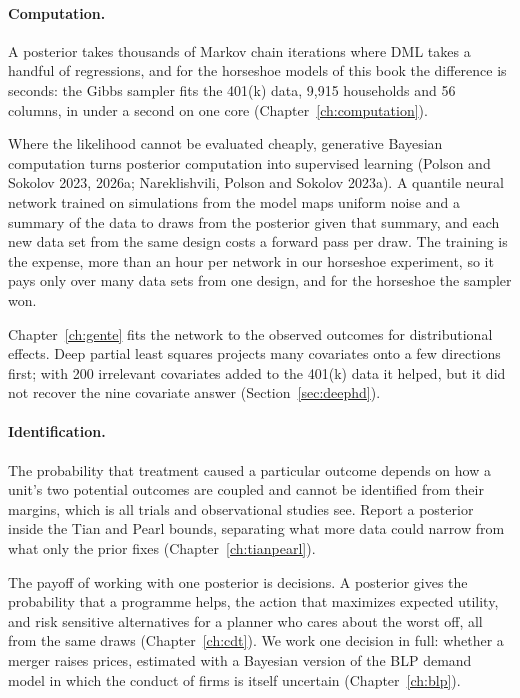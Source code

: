 \paragraph{Computation.} A posterior takes thousands of Markov chain iterations where DML takes a handful of regressions, and for the horseshoe models of this book the difference is seconds: the Gibbs sampler fits the 401(k) data, 9,915 households and 56 columns, in under a second on one core (Chapter~\ref{ch:computation}).

Where the likelihood cannot be evaluated cheaply, generative Bayesian computation turns posterior computation into supervised learning (Polson and Sokolov 2023, 2026a; Nareklishvili, Polson and Sokolov 2023a). A quantile neural network trained on simulations from the model maps uniform noise and a summary of the data to draws from the posterior given that summary, and each new data set from the same design costs a forward pass per draw. The training is the expense, more than an hour per network in our horseshoe experiment, so it pays only over many data sets from one design, and for the horseshoe the sampler won. 

Chapter~\ref{ch:gente} fits the network to the observed outcomes for distributional effects. Deep partial least squares projects many covariates onto a few directions first; with 200 irrelevant covariates added to the 401(k) data it helped, but it did not recover the nine covariate answer (Section~\ref{sec:deephd}).

\paragraph{Identification.} The probability that treatment caused a particular outcome depends on how a unit's two potential outcomes are coupled and cannot be identified from their margins, which is all trials and observational studies see. Report a posterior inside the Tian and Pearl bounds, separating what more data could narrow from what only the prior fixes (Chapter~\ref{ch:tianpearl}).

The payoff of working with one posterior is decisions. A posterior gives the probability that a programme helps, the action that maximizes expected utility, and risk sensitive alternatives for a planner who cares about the worst off, all from the same draws (Chapter~\ref{ch:cdt}). We work one decision in full: whether a merger raises prices, estimated with a Bayesian version of the BLP demand model in which the conduct of firms is itself uncertain (Chapter~\ref{ch:blp}).


